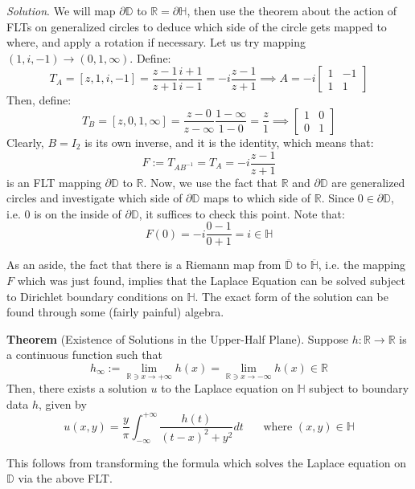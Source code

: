 \textit{Solution}.  We will map $\partial \mathbb{D}$ to $\mathbb{R}=\partial\mathbb{H}$, then use the theorem about the action of FLTs on generalized circles to deduce which side of the circle gets mapped to where, and apply a rotation if necessary. Let us try mapping $(1,i,-1)\to (0, 1, \infty)$. Define: \[T_A = [z, 1, i, -1] = \frac{z-1}{z+1} \frac{i+1}{i-1} = -i\frac{z-1}{z+1} \implies A = -i\begin{bmatrix}
    1 & -1\\
    1 & 1
\end{bmatrix}\] Then, define: \[T_B = [z,0,1,\infty] = \frac{z-0}{z-\infty} \frac{1-\infty}{1-0} = \frac{z}{1} \implies \begin{bmatrix}
    1 & 0\\
    0 & 1
\end{bmatrix}\] Clearly, $B=I_2$ is its own inverse, and it is the identity, which means that: \[F:=T_{AB^{-1}} = T_A = -i \frac{z-1}{z+1}\] is an FLT mapping $\partial\mathbb{D}$ to $\mathbb{R}$. Now, we use the fact that $\mathbb{R}$ and $\partial\mathbb{D}$ are generalized circles and investigate which side of $\partial\mathbb{D}$ maps to which side of $\mathbb{R}$. Since $0\in\partial\mathbb{D}$, i.e. $0$ is on the inside of $\partial\mathbb{D}$, it suffices to check this point. Note that: \[F(0) = -i\frac{0-1}{0+1} = i \in\mathbb{H}\]

As an aside, the fact that there is a Riemann map from $\overline{\mathbb{D}}$ to $\overline{\mathbb{H}}$, i.e. the mapping $F$ which was just found, implies that the Laplace Equation can be solved subject to Dirichlet boundary conditions on $\mathbb{H}$. The exact form of the solution can be found through some (fairly painful) algebra.

\textbf{Theorem} (Existence of Solutions in the Upper-Half Plane). Suppose $h:\mathbb{R}\to\mathbb{R}$ is a continuous function such that \[h_\infty := \lim_{\mathbb{R}\ni x\to +\infty} h(x) = \lim_{\mathbb{R}\ni x\to -\infty} h(x) \in \mathbb{R}\] Then, there exists a solution $u$ to the Laplace equation on $\mathbb{H}$ subject to boundary data $h$, given by \[u(x,y) = \frac{y}{\pi} \int_{-\infty}^{+\infty} \frac{h(t)}{(t-x)^2 + y^2} dt\ \ \ \ \ \ \ \ \text{where }(x,y)\in\mathbb{H}\]

This follows from transforming the formula which solves the Laplace equation on $\mathbb{D}$ via the above FLT.